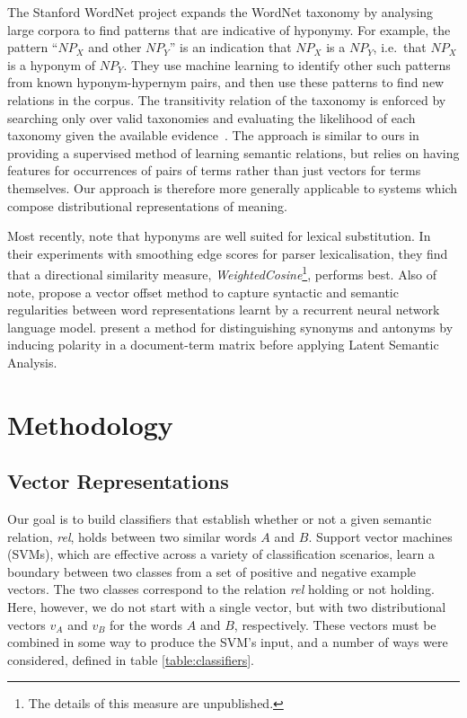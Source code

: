 \documentclass[11pt]{article}
\begin{document}
The Stanford WordNet project \cite{Snow:04} expands the WordNet
taxonomy by analysing large corpora to find patterns that are
indicative of hyponymy. For example, the pattern ``$\mathit{NP}_X$ and
other $\mathit{NP}_Y$'' is an indication that $\mathit{NP}_X$ is a
$\mathit{NP}_Y$, i.e.~that $\mathit{NP}_X$ is a hyponym of
$\mathit{NP}_Y$. They use machine learning to identify other such
patterns from known hyponym-hypernym pairs, and then use these
patterns to find new relations in the corpus. The
transitivity relation of the taxonomy is enforced by searching only over valid
taxonomies and evaluating the likelihood of each taxonomy given the
available evidence~\cite{Snow:06}. The approach is similar to
ours in providing a supervised method of learning semantic relations, but relies on having features for occurrences of pairs of terms rather than just vectors for terms themselves. Our approach is therefore more generally applicable to systems which compose distributional
representations of meaning.

Most recently,  note that hyponyms are well suited for lexical substitution.  In their experiments with smoothing edge scores for parser lexicalisation, they find that a directional similarity measure,  \emph{WeightedCosine}\footnote{The details of this measure are unpublished.}, performs best. Also of note,  propose a vector offset method to capture syntactic and semantic regularities between word representations learnt by a recurrent neural network language model.   present a method for distinguishing synonyms and antonyms by inducing polarity in a document-term matrix before applying Latent Semantic Analysis.


\section{Methodology}

\subsection{Vector Representations}
\label{sect:representations}

Our goal is to build classifiers that establish whether or not a given
semantic relation, \emph{rel}, holds between two similar words $A$ and
$B$.  Support vector machines (SVMs), which are effective across a
variety of classification scenarios, learn a boundary between two
classes from a set of positive and negative example vectors.  The two
classes correspond to the relation \emph{rel} holding or not holding.
Here, however, we do not start with a single vector, but with two
distributional vectors $v_A$ and $v_B$ for the words $A$ and $B$,
respectively. These vectors must be combined in some way to produce
the SVM's input, and a number of ways were considered, defined in
table \ref{table:classifiers}.
\end{document}
